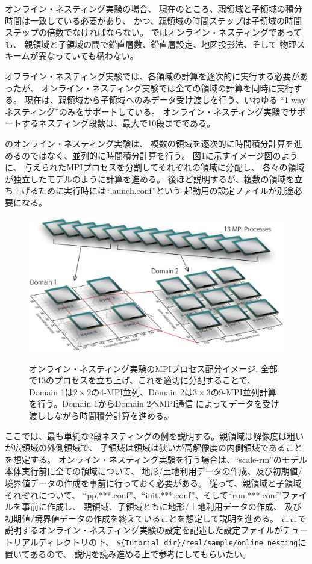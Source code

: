 オンライン・ネスティング実験の場合、
現在のところ、親領域と子領域の積分時間は一致している必要があり、
かつ、親領域の時間ステップは子領域の時間ステップの倍数でなければならない。
\scalerm ではオンライン・ネスティングであっても、
親領域と子領域の間で鉛直層数、鉛直層設定、地図投影法、そして
物理スキームが異なっていても構わない。

オフライン・ネスティング実験では、各領域の計算を逐次的に実行する必要があったが、
オンライン・ネスティング実験では全ての領域の計算を同時に実行する。
現在は、親領域から子領域へのみデータ受け渡しを行う、いわゆる
``1-wayネスティング''のみをサポートしている。
オンライン・ネスティング実験でサポートするネスティング段数は、最大で10段までである。

\scalerm のオンライン・ネスティング実験は、
複数の領域を逐次的に時間積分計算を進めるのではなく、並列的に時間積分計算を行う。
図\ref{fig_mpisplit}に示すイメージ図のように、
与えられたMPIプロセスを分割してそれぞれの領域に分配し、
各々の領域が独立したモデルのように計算を進める。
後ほど説明するが、複数の領域を立ち上げるために実行時には``launch.conf''という
起動用の設定ファイルが別途必要になる。

\begin{figure}[t]
\begin{center}
  \includegraphics[width=0.8\hsize]{./figure/mpisplit_nesting.eps}\\
  \caption{オンライン・ネスティング実験のMPIプロセス配分イメージ. 全部で13のプロセスを立ち上げ、これを適切に分配することで、
           Domain 1は$2 \times 2$の4-MPI並列、Domain 2は$3 \times 3$の9-MPI並列計算を行う。Domain 1からDomain 2へMPI通信
           によってデータを受け渡ししながら時間積分計算を進める。}
  \label{fig_mpisplit}
\end{center}
\end{figure}


ここでは、最も単純な2段ネスティングの例を説明する。親領域は解像度は粗いが広領域の外側領域で、
子領域は領域は狭いが高解像度の内側領域であることを想定する。
オンライン・ネスティング実験を行う場合は、``scale-rm''のモデル本体実行前に全ての領域について、
地形/土地利用データの作成、及び初期値/境界値データの作成を事前に行っておく必要がある。
従って、親領域と子領域それぞれについて、
``pp.***.conf''、``init.***.conf''、そして``run.***.conf''ファイルを事前に作成し、
親領域、子領域ともに地形/土地利用データの作成、
及び初期値/境界値データの作成を終えていることを想定して説明を進める。
ここで説明するオンライン・ネスティング実験の設定を記述した設定ファイルがチュートリアルディレクトリの下、
\verb|${Tutorial_dir}/real/sample/online_nesting|に置いてあるので、
説明を読み進める上で参考にしてもらいたい。



